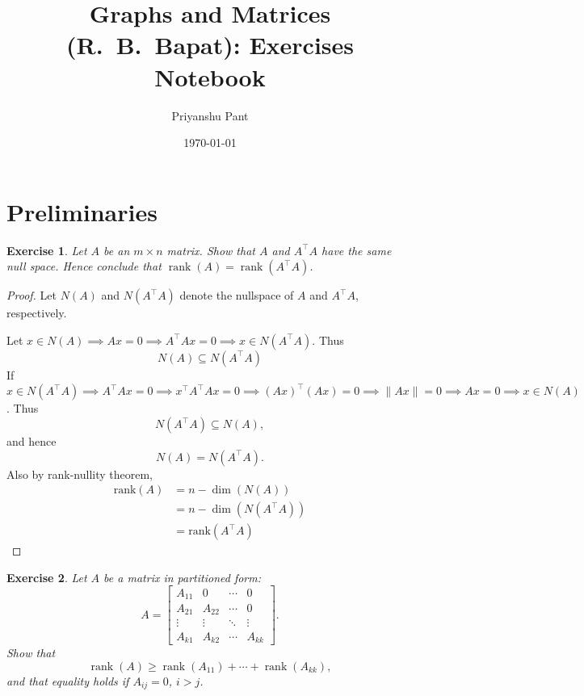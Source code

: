 \documentclass[11pt]{article}
\title{Graphs and Matrices (R.\ B.\ Bapat): Exercises Notebook}
\author{Priyanshu Pant}
\date{\today}
\newcommand{\rank}{\mathrm{rank}}
\newtheorem{exercise}{Exercise}[section]
\theoremstyle{definition}
\begin{document}
\maketitle
\tableofcontents

\clearpage
\section{Preliminaries}

\begin{exercise}
Let $A$ be an $m\times n$ matrix. Show that $A$ and $A^\top A$ have the same null space.
Hence conclude that $\operatorname{rank}(A)=\operatorname{rank}(A^\top A)$.
\end{exercise}
\begin{proof}
Let $N(A)$ and $N(A^\top A)$ denote the nullspace of $A$ and $A^\top A$, respectively. 

\noindent Let $x \in N(A) \implies Ax=0 \implies A^\top Ax=0 \implies x \in N(A^\top A).$
Thus $$N(A) \subseteq N(A^\top A)$$
If $x \in N(A^\top A) \implies A^\top Ax=0 \implies x^\top A^\top Ax =0 \implies (Ax)^\top (Ax)=0 \implies \|Ax\|=0 \implies Ax=0 \implies x \in N(A)$.
Thus $$N(A^\top A) \subseteq N(A),$$ and hence $$N(A)=N(A^\top A).$$
Also by rank-nullity theorem, 
\begin{align*}
    \rank(A) &= n-\dim(N(A)) \\
    &= n- \dim(N(A^\top A))\\
    &= \rank (A^\top A)
\end{align*}

\end{proof}

\begin{exercise}
Let $A$ be a matrix in partitioned form:
\[
A=
\begin{bmatrix}
A_{11} & 0      & \cdots & 0\\
A_{21} & A_{22} & \cdots & 0\\
\vdots & \vdots & \ddots & \vdots\\
A_{k1} & A_{k2} & \cdots & A_{kk}
\end{bmatrix}.
\]
Show that
\[
\operatorname{rank}(A)\ge \operatorname{rank}(A_{11})+\cdots+\operatorname{rank}(A_{kk}),
\]
and that equality holds if $A_{ij}=0$, $i>j$.
\end{exercise}
\end{document}
